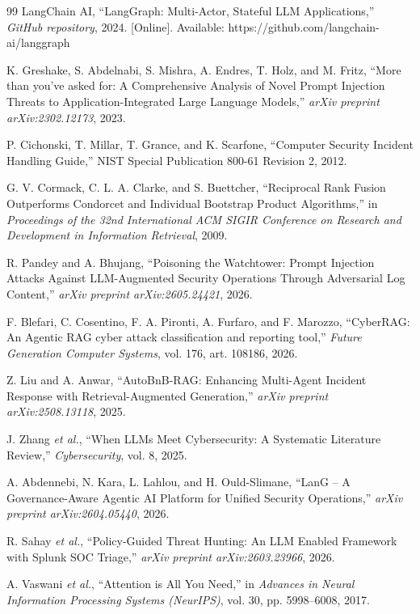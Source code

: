 \documentclass[12pt,a4paper]{report}
\begin{document}
\begin{thebibliography}{99}
LangChain AI, ``LangGraph: Multi-Actor, Stateful LLM Applications,'' \textit{GitHub repository}, 2024. [Online]. Available: https://github.com/langchain-ai/langgraph

K. Greshake, S. Abdelnabi, S. Mishra, A. Endres, T. Holz, and M. Fritz, ``More than you've asked for: A Comprehensive Analysis of Novel Prompt Injection Threats to Application-Integrated Large Language Models,'' \textit{arXiv preprint arXiv:2302.12173}, 2023.

P. Cichonski, T. Millar, T. Grance, and K. Scarfone, ``Computer Security Incident Handling Guide,'' NIST Special Publication 800-61 Revision 2, 2012.

G. V. Cormack, C. L. A. Clarke, and S. Buettcher, ``Reciprocal Rank Fusion Outperforms Condorcet and Individual Bootstrap Product Algorithms,'' in \textit{Proceedings of the 32nd International ACM SIGIR Conference on Research and Development in Information Retrieval}, 2009.

R. Pandey and A. Bhujang, ``Poisoning the Watchtower: Prompt Injection Attacks Against LLM-Augmented Security Operations Through Adversarial Log Content,'' \textit{arXiv preprint arXiv:2605.24421}, 2026.

F. Blefari, C. Cosentino, F. A. Pironti, A. Furfaro, and F. Marozzo, ``CyberRAG: An Agentic RAG cyber attack classification and reporting tool,'' \textit{Future Generation Computer Systems}, vol. 176, art. 108186, 2026.

Z. Liu and A. Anwar, ``AutoBnB-RAG: Enhancing Multi-Agent Incident Response with Retrieval-Augmented Generation,'' \textit{arXiv preprint arXiv:2508.13118}, 2025.

J. Zhang \textit{et al.}, ``When LLMs Meet Cybersecurity: A Systematic Literature Review,'' \textit{Cybersecurity}, vol. 8, 2025.

A. Abdennebi, N. Kara, L. Lahlou, and H. Ould-Slimane, ``LanG -- A Governance-Aware Agentic AI Platform for Unified Security Operations,'' \textit{arXiv preprint arXiv:2604.05440}, 2026.

R. Sahay \textit{et al.}, ``Policy-Guided Threat Hunting: An LLM Enabled Framework with Splunk SOC Triage,'' \textit{arXiv preprint arXiv:2603.23966}, 2026.

A. Vaswani \textit{et al.}, ``Attention is All You Need,'' in \textit{Advances in Neural Information Processing Systems (NeurIPS)}, vol. 30, pp. 5998--6008, 2017.


\end{thebibliography}
\end{document}
